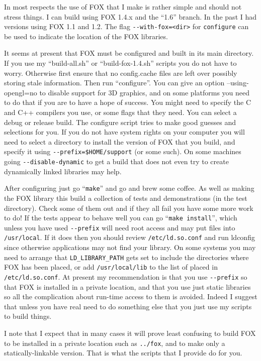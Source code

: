 \documentclass[11pt]{article}
\begin{document}
In most respects the use of FOX that I make is rather simple and should
not stress things. I can build using FOX 1.4.x and the ``1.6'' branch.
In the past I had versions using FOX 1.1 and 1.2.
The flag \verb+--with-fox=<dir>+
for \verb+configure+ can be used to indicate the location
of the FOX libraries. 

It seems at present that FOX must be configured and built in its main
directory. If you use my ``build-all.sh'' or ``build-fox-1.4.sh'' scripts
you do not have to worry. Otherwise first ensure that no config.cache files
are left over possibly storing stale information. Then run ``configure''.
You can give an option --using-opengl=no to disable support for 3D graphics,
and on some platforms you need to do that if you are to have a hope of
success. You might need to specify the C and C++ compilers you use, or some
flags that they need. You can select a debug or release build. The
configure script tries to make good guesses and selections for you.
If you do not have system rights on your computer you will need to
select a directory to install the version of FOX that you build, and
specify it using \verb+--prefix=$HOME/support+ (or some such). On some
machines going \verb+--disable-dynamic+ to get a build that does not even try
to create dynamically linked libraries may help.

After configuring just go ``\verb+make+'' and go and brew some coffee. 
As well as making the FOX library this build a collection of tests and
demonstrations (in the test directory). Check some of them out and if
they all fail you have some more work to do! If the tests appear to behave
well you can go ``\verb+make install+'', which unless you have used
\verb+--prefix+ will need root access and may put files
into \verb+/usr/local+. If it does then you should review
\verb+/etc/ld.so.conf+ and run ldconfig since otherwise applications may
not find your library. On some systems you may need to arrange that
\verb+LD_LIBRARY_PATH+ gets set to include the directories where FOX has
been placed, or add \verb+/usr/local/lib+ to the list of placed in
\verb+/etc/ld.so.conf+. At present my recommendation is that you use
\verb+--prefix+ so that FOX is installed in a private location, and that you
use just static libraries so all the complication about run-time access to
them is avoided. Indeed I suggest that unless you have real need to do
something else that you just use my scripts to build things.

I note that I expect that in many cases it will prove least confusing to build
FOX to be installed in a private location such as \verb+../fox+, and to
make only a statically-linkable version. That is what the scripts that I
provide do for you.
\end{document}
